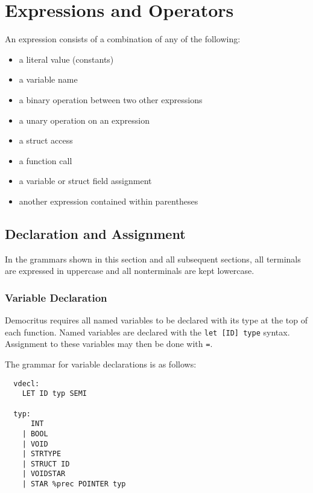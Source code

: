\section{Expressions and Operators}
	An expression consists of a combination of any of the following:
    \begin{itemize}
        \item a literal value (constants)
        \item a variable name
        \item a binary operation between two other expressions
        \item a unary operation on an expression
        \iffalse \item an array access operation\fi
        \item a struct access 
        \item a function call
        \item a variable or struct field assignment
        \item another expression contained within parentheses 
    \end{itemize}





    \subsection{Declaration and Assignment}
      In the grammars shown in this section and all subsequent sections, all terminals are expressed in uppercase and all nonterminals are kept lowercase. 

      \subsubsection{Variable Declaration}
      	Democritus requires all named variables to be declared with its type at the top of each function. Named variables are declared with the \texttt{let [ID] type} syntax. Assignment to these variables may then be done with \texttt{=}.
        
        \bigskip \noindent 
        The grammar for variable declarations is as follows: 
        \begin{verbatim}
  vdecl:
    LET ID typ SEMI 

  typ:
      INT       
    | BOOL      
    | VOID      
    | STRTYPE   
    | STRUCT ID 
    | VOIDSTAR  
    | STAR %prec POINTER typ 
        \end{verbatim}

